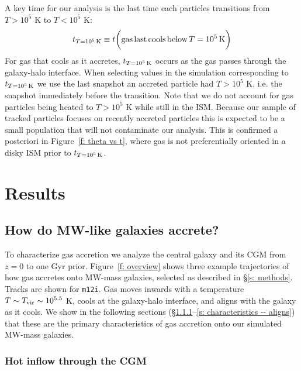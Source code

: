 \documentclass[fleqn,usenatbib]{mnras}
\newcommand{\tcon}{t_{T=10^5\,{\rm K}}}
\begin{document}
A key time for our analysis is the last time each particles transitions from $T > 10^5$ K to $T< 10^5$ K:
\begin{equation}
    \tcon \equiv t \bigg( {\rm gas\,last\,cools\,below}\,T=10^5\,{\rm K} \bigg)
\end{equation}
For gas that cools as it accretes, $\tcon$ occurs as the gas passes through the galaxy-halo interface.
When selecting values in the simulation corresponding to $\tcon$ we use the last snapshot an accreted particle had $T > 10^5$ K, i.e. the snapshot immediately before the transition.
Note that we do not account for gas particles being heated to $T > 10^5$ K while still in the ISM.
Because our sample of tracked particles focuses on recently accreted particles this is expected to be a small population that will not contaminate our analysis.
This is confirmed a posteriori in Figure~\ref{f: theta vs t}, where gas is not preferentially oriented in a disky ISM prior to $\tcon$.

\section{Results}
\label{s: results}


\subsection{How do MW-like galaxies accrete?}
\label{s: characteristics}

To characterize gas accretion we analyze the central galaxy and its CGM from $z=0$ to one Gyr prior.
Figure~\ref{f: overview} shows three example trajectories of how gas accretes onto MW-mass galaxies, selected as described in \S\ref{s: methods}.
Tracks are shown for \texttt{m12i}.
Gas moves inwards with a temperature $T \sim T_{\rm vir} \sim 10^{5.5}$ K, cools at the galaxy-halo interface, and aligns with the galaxy as it cools.
We show in the following sections (\S\ref{s: characteristics -- inflowing gas phase}--\ref{s: characteristics -- aligns}) that these are the primary characteristics of gas accretion onto our simulated MW-mass galaxies.

\subsubsection{Hot inflow through the CGM}
\label{s: characteristics -- inflowing gas phase}
\end{document}

